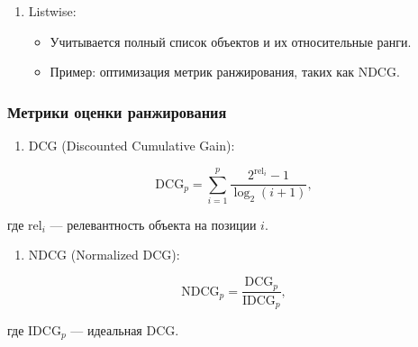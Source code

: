 \begin{enumerate}
\begin{enumerate}
  \begin{itemize}
  \tightlist
  \item
    Модели обучаются на парах объектов, предсказывая, какой объект более
    релевантен.
  \item
    Пример: алгоритмы, использующие SVM или нейронные сети.
  \end{itemize}
\item
  Listwise:

  \begin{itemize}
  \tightlist
  \item
    Учитывается полный список объектов и их относительные ранги.
  \item
    Пример: оптимизация метрик ранжирования, таких как NDCG.
  \end{itemize}
\end{enumerate}

\hypertarget{ux43cux435ux442ux440ux438ux43aux438-ux43eux446ux435ux43dux43aux438-ux440ux430ux43dux436ux438ux440ux43eux432ux430ux43dux438ux44f}{%
\subsubsection*{Метрики оценки
ранжирования}\label{ux43cux435ux442ux440ux438ux43aux438-ux43eux446ux435ux43dux43aux438-ux440ux430ux43dux436ux438ux440ux43eux432ux430ux43dux438ux44f}}

\begin{enumerate}
\def\labelenumi{\arabic{enumi}.}
\tightlist
\item
  DCG (Discounted Cumulative Gain):
\end{enumerate}

\begin{equation}
   \text{DCG}_p = \sum_{i=1}^p \frac{2^{\text{rel}_i} - 1}{\log_2(i + 1)},
\end{equation}

где \( \text{rel}_i \) --- релевантность объекта на позиции \(i \).

\begin{enumerate}
\def\labelenumi{\arabic{enumi}.}
\setcounter{enumi}{2}
\tightlist
\item
  NDCG (Normalized DCG):
\end{enumerate}

\begin{equation}
   \text{NDCG}_p = \frac{\text{DCG}_p}{\text{IDCG}_p},
\end{equation}

где \( \text{IDCG}_p \) --- идеальная DCG.


\end{enumerate}
